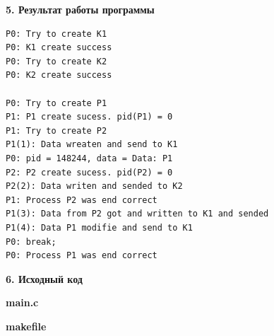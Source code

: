 \documentclass[a4paper,12pt]{article} %
\newcommand{\myCodeInput}[3]{
{\bf #2}

}
\begin{document}
\begin{Large}
\textbf{5. Результат работы программы}\\
\end{Large}

\begin{lstlisting}
P0: Try to create K1
P0: K1 create success
P0: Try to create K2
P0: K2 create success

P0: Try to create P1
P1: P1 create sucess. pid(P1) = 0
P1: Try to create P2
P1(1): Data wreaten and send to K1
P0: pid = 148244, data = Data: P1
P2: P2 create sucess. pid(P2) = 0
P2(2): Data writen and sended to K2
P1: Process P2 was end correct
P1(3): Data from P2 got and written to K1 and sended
P1(4): Data P1 modifie and send to K1
P0: break;
P0: Process P1 was end correct
\end{lstlisting}

\newpage

\begin{Large}
\textbf{6. Исходный код}
\end{Large}

\myCodeInput{c}{main.c}{main.c}
\myCodeInput{make}{makefile}{makefile}
\end{document}
